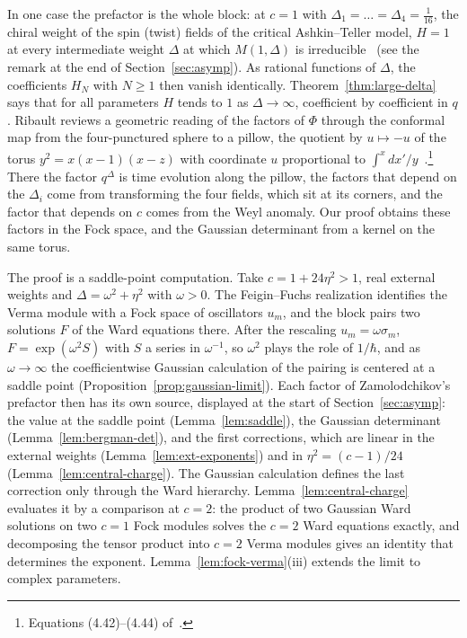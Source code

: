\documentclass[twoside,10pt]{article}
\numberwithin{equation}{section}
\theoremstyle{slbody}
\theoremstyle{definition}
\theoremstyle{remark}
\begin{document}
In one case the prefactor is the whole block: at \(c=1\) with
\(\Delta_1=\dots=\Delta_4=\frac1{16}\), the chiral weight of the spin (twist)
fields of the critical Ashkin--Teller model, \(H=1\) at every intermediate
weight \(\Delta\) at which \(M(1,\Delta)\) is
irreducible~\cite[(2.28)]{Zamolodchikov1986} (see the remark at the end of
Section~\ref{sec:asymp}).  As rational functions of \(\Delta\), the
coefficients \(H_N\) with \(N\geq1\) then vanish identically.
Theorem~\ref{thm:large-delta} says that for all parameters \(H\) tends to
\(1\) as \(\Delta\to\infty\), coefficient by coefficient in \(q\).  Ribault
reviews a geometric reading of the factors of \(\Phi\) through the conformal
map from the four-punctured sphere to a pillow, the quotient by
\(u\mapsto-u\) of the torus \(y^2=x(x-1)(x-z)\) with coordinate \(u\)
proportional to \(\int^x dx'/y\)~\cite[\S4.3.4]{Ribault2026}.\footnote{Equations (4.42)--(4.44) of~\cite{Ribault2026}.}  There the factor
\(q^\Delta\) is time evolution along the pillow, the factors that depend on
the \(\Delta_i\) come from transforming the four fields, which sit at its
corners, and the factor that depends on \(c\) comes from the Weyl anomaly.
Our proof obtains these factors in the Fock space, and the Gaussian
determinant from a kernel on the same torus.

The proof is a saddle-point computation.  Take
\(c=1+24\eta^2>1\), real external weights and \(\Delta=\omega^2+\eta^2\) with
\(\omega>0\).  The Feigin--Fuchs realization identifies the Verma module with a
Fock space of oscillators \(u_m\), and the block pairs two solutions \(F\) of
the Ward equations there.  After the rescaling
\(u_m=\omega\sigma_m\), \(F=\exp(\omega^2S)\) with \(S\) a series in
\(\omega^{-1}\), so \(\omega^2\) plays the
role of \(1/\hbar\), and as \(\omega\to\infty\) the coefficientwise Gaussian
calculation of the pairing is centered at a saddle point
(Proposition~\ref{prop:gaussian-limit}).  Each factor of
Zamolodchikov's prefactor then has its own source, displayed at the start of
Section~\ref{sec:asymp}: the value at the saddle point
(Lemma~\ref{lem:saddle}), the Gaussian determinant
(Lemma~\ref{lem:bergman-det}), and the first corrections, which are linear in
the external weights (Lemma~\ref{lem:ext-exponents}) and in
\(\eta^2=(c-1)/24\) (Lemma~\ref{lem:central-charge}).  The Gaussian
calculation defines the last correction only through the Ward hierarchy.
Lemma~\ref{lem:central-charge} evaluates it by a comparison at \(c=2\): the
product of two Gaussian Ward solutions on two \(c=1\) Fock modules solves the
\(c=2\) Ward equations exactly, and decomposing the tensor product into
\(c=2\) Verma modules gives an identity that determines the exponent.
Lemma~\ref{lem:fock-verma}(iii) extends the limit to complex parameters.
\end{document}
